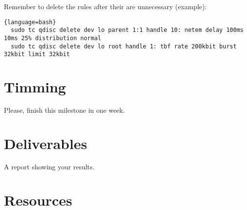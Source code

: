 Remember to delete the rules after their are unnecessary (example):

\begin{lstlisting}{language=bash}
  sudo tc qdisc delete dev lo parent 1:1 handle 10: netem delay 100ms 10ms 25% distribution normal
  sudo tc qdisc delete dev lo root handle 1: tbf rate 200kbit burst 32kbit limit 32kbit
\end{lstlisting}

\section{Timming}

Please, finish this milestone in one week.

\section{Deliverables}

A report showing your results.

\section{Resources}


